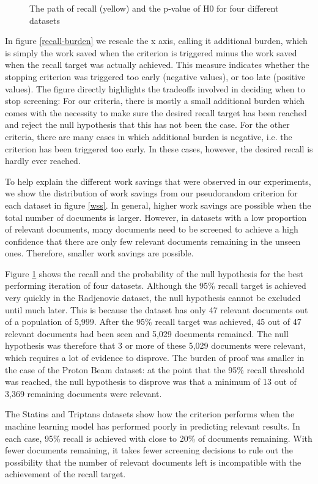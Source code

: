 \documentclass{bmcart}
\begin{document}
\begin{figure}
		\caption{\small The path of recall (yellow) and the p-value of H0 for four different datasets} 
		\label{H0paths}
	\end{figure}
	
	In figure \ref{recall-burden} we rescale the x axis, calling it additional burden, which is simply the work saved when the criterion is triggered minus the work saved when the recall target was actually achieved. This measure indicates whether the stopping criterion was triggered too early (negative values), or too late (positive values). The figure directly highlights the tradeoffs involved in deciding when to stop screening: For our criteria, there is mostly a small additional burden which comes with the necessity to make sure the desired recall target has been reached and reject the null hypothesis that this has not been the case. For the other criteria, there are many cases in which additional burden is negative, i.e. the criterion has been triggered too early. In these cases, however, the desired recall is hardly ever reached.
	
	To help explain the different work savings that were observed in our experiments, we show the distribution of work savings from our pseudorandom criterion for each dataset in figure \ref{wss}. In general, higher work savings are possible when the total number of documents is larger. However, in datasets with a low proportion of relevant documents, many documents need to be screened to achieve a high confidence that there are only few relevant documents remaining in the unseen ones. Therefore, smaller work savings are possible. 
	
	Figure \ref{H0paths} shows the recall and the probability of the null hypothesis for the best performing iteration of four datasets. Although the 95\% recall target is achieved very quickly in the Radjenovic dataset, the null hypothesis cannot be excluded until much later. This is because the dataset has only 47 relevant documents out of a population of 5,999. After the 95\% recall target was achieved, 45 out of 47 relevant documents had been seen and 5,029 documents remained. The null hypothesis was therefore that 3 or more of these 5,029 documents were relevant, which requires a lot of evidence to disprove. The burden of proof was smaller in the case of the Proton Beam dataset: at the point that the 95\% recall threshold was reached, the null hypothesis to disprove was that a minimum of 13 out of 3,369 remaining documents were relevant. 
	
	The Statins and Triptans datasets show how the criterion performs when the machine learning model has performed poorly in predicting relevant results. In each case, 95\% recall is achieved with close to 20\% of documents remaining. With fewer documents remaining, it takes fewer screening decisions to rule out the possibility that the number of relevant documents left is incompatible with the achievement of the recall target.
	
\end{document}
